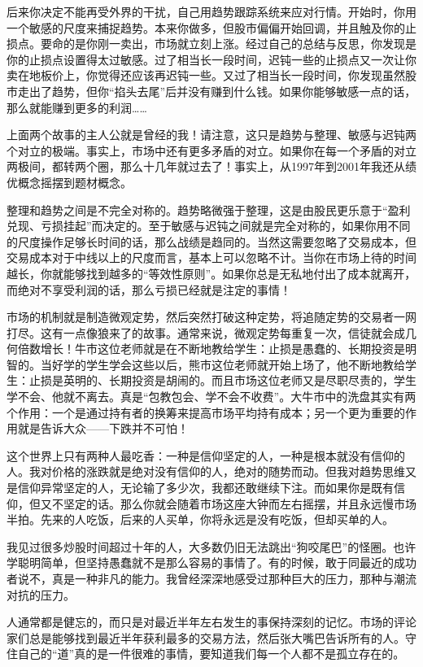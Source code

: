 后来你决定不能再受外界的干扰，自己用趋势跟踪系统来应对行情。开始时，你用一个敏感的尺度来捕捉趋势。本来你做多，但股市偏偏开始回调，并且触及你的止损点。要命的是你刚一卖出，市场就立刻上涨。经过自己的总结与反思，你发现是你的止损点设置得太过敏感。过了相当长一段时间，迟钝一些的止损点又一次让你卖在地板价上，你觉得还应该再迟钝一些。又过了相当长一段时间，你发现虽然股市走出了趋势，但你“掐头去尾”后并没有赚到什么钱。如果你能够敏感一点的话，那么就能赚到更多的利润……

上面两个故事的主人公就是曾经的我！请注意，这只是趋势与整理、敏感与迟钝两个对立的极端。事实上，市场中还有更多矛盾的对立。如果你在每一个矛盾的对立两极间，都转两个圈，那么十几年就过去了！事实上，从1997年到2001年我还从绩优概念摇摆到题材概念。

整理和趋势之间是不完全对称的。趋势略微强于整理，这是由股民更乐意于“盈利兑现、亏损挂起”而决定的。至于敏感与迟钝之间就是完全对称的，如果你用不同的尺度操作足够长时间的话，那么战绩是趋同的。当然这需要忽略了交易成本，但交易成本对于中线以上的尺度而言，基本上可以忽略不计。当你在市场上待的时间越长，你就能够找到越多的“等效性原则”。如果你总是无私地付出了成本就离开，而绝对不享受利润的话，那么亏损已经就是注定的事情！

市场的机制就是制造微观定势，然后突然打破这种定势，将追随定势的交易者一网打尽。这有一点像狼来了的故事。通常来说，微观定势每重复一次，信徒就会成几何倍数增长！牛市这位老师就是在不断地教给学生：止损是愚蠢的、长期投资是明智的。当好学的学生学会这些以后，熊市这位老师就开始上场了，他不断地教给学生：止损是英明的、长期投资是胡闹的。而且市场这位老师又是尽职尽责的，学生学不会、他就不离去。真是“包教包会、学不会不收费”。大牛市中的洗盘其实有两个作用：一个是通过持有者的换筹来提高市场平均持有成本；另一个更为重要的作用就是告诉大众——下跌并不可怕！

这个世界上只有两种人最吃香：一种是信仰坚定的人，一种是根本就没有信仰的人。我对价格的涨跌就是绝对没有信仰的人，绝对的随势而动。但我对趋势思维又是信仰异常坚定的人，无论输了多少次，我都还敢继续下注。而如果你是既有信仰，但又不坚定的话。那么你就会随着市场这座大钟而左右摇摆，并且永远慢市场半拍。先来的人吃饭，后来的人买单，你将永远是没有吃饭，但却买单的人。

我见过很多炒股时间超过十年的人，大多数仍旧无法跳出“狗咬尾巴”的怪圈。也许学聪明简单，但坚持愚蠢就不是那么容易的事情了。有的时候，敢于同最近的成功者说不，真是一种非凡的能力。我曾经深深地感受过那种巨大的压力，那种与潮流对抗的压力。

人通常都是健忘的，而只是对最近半年左右发生的事保持深刻的记忆。市场的评论家们总是能够找到最近半年获利最多的交易方法，然后张大嘴巴告诉所有的人。守住自己的“道”真的是一件很难的事情，要知道我们每一个人都不是孤立存在的。

